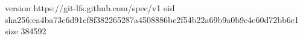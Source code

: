 version https://git-lfs.github.com/spec/v1
oid sha256:ea4ba73c6d91cf8f382265287a4508886be2f54b22a69b9a0b9c4e60d72bb6e1
size 384592
